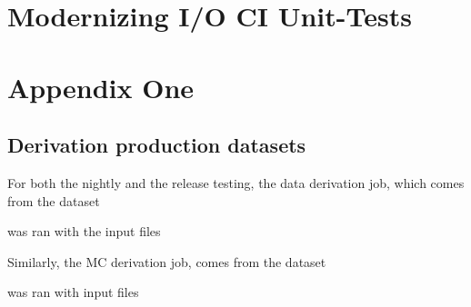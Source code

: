 \documentclass[12pt]{niuthesis}
\begin{document}
\chapter{Modernizing I/O CI Unit-Tests}


\printbibliography

\clearpage
\appendix
\chapter{Appendix One}
\section{Derivation production datasets} \label{sec: deriv job dataset}


For both the nightly and the release testing, the data derivation job, which comes from the dataset 



was ran with the input files 



Similarly, the MC derivation job, comes from the dataset 



was ran with input files


\end{document}
